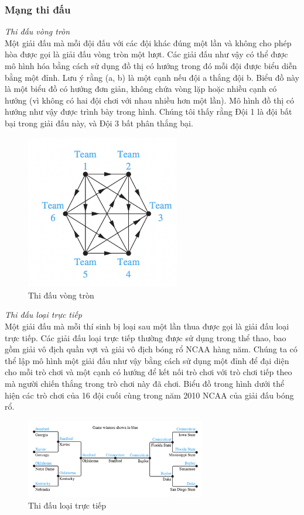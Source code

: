 \subsubsection{Mạng thi đấu}
\textit{Thi đấu vòng tròn} \\
Một giải đấu mà mỗi đội đấu với các đội khác đúng một lần và không cho phép hòa được gọi là giải đấu vòng tròn một lượt. Các giải đấu như vậy có thể được mô hình hóa bằng cách sử dụng đồ thị có hướng trong đó mỗi đội được biểu diễn bằng một đỉnh. Lưu ý rằng (a, b) là một cạnh nếu đội a thắng đội b. Biểu đồ này là một biểu đồ có hướng đơn giản, không chứa vòng lặp hoặc nhiều cạnh có hướng (vì không có hai đội chơi với nhau nhiều hơn một lần). Mô hình đồ thị có hướng như vậy được trình bày trong hình. Chúng tôi thấy rằng Đội 1 là đội bất bại trong giải đấu này,
và Đội 3 bất phân thắng bại.\\
\begin{figure}[H] %
    \centering %
    \includegraphics[width=0.6\textwidth]{assets/dothi_thidauvongtron.png} 
    \caption{Thi đấu vòng tròn} %
\end{figure}
\textit{Thi đấu loại trực tiếp} \\
Một giải đấu mà mỗi thí sinh bị loại sau một lần thua được gọi là giải đấu loại trực tiếp. Các giải đấu loại trực tiếp thường được sử dụng trong thể thao, bao gồm giải vô địch quần vợt và giải vô địch bóng rổ NCAA hàng năm. Chúng ta có thể lập mô hình một giải đấu như vậy bằng cách sử dụng một đỉnh để đại diện cho mỗi trò chơi và một cạnh có hướng để kết nối trò chơi với trò chơi tiếp theo mà người chiến thắng trong trò chơi này đã chơi. Biểu đồ trong hình dưới thể hiện các trò chơi của 16 đội cuối cùng trong năm 2010 NCAA của
giải đấu bóng rổ.
\begin{figure}[H] %
    \centering %
    \includegraphics[width=0.7\textwidth]{assets/dothi_thidauloaitructiep.png} 
    \caption{Thi đấu loại trực tiếp} %
\end{figure}